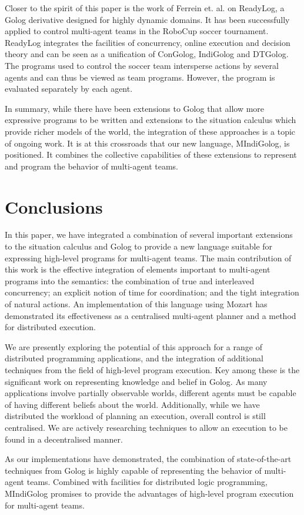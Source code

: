 \documentclass{llncs}
\begin{document}
Closer to the spirit of this paper is the work of Ferrein et. al.
\cite{Ferrein2005readylog} on ReadyLog, a Golog derivative designed
for highly dynamic domains. It has been successfully applied to control
multi-agent teams in the RoboCup soccer tournament. ReadyLog integrates
the facilities of concurrency, online execution and decision theory
and can be seen as a unification of ConGolog, IndiGolog and DTGolog.
The programs used to control the soccer team intersperse actions by
several agents and can thus be viewed as team programs. However, the
program is evaluated separately by each agent.

In summary, while there have been extensions to Golog that allow more
expressive programs to be written and extensions to the situation
calculus which provide richer models of the world, the integration
of these approaches is a topic of ongoing work. It is at this crossroads
that our new language, MIndiGolog, is positioned. It combines the
collective capabilities of these extensions to represent and program
the behavior of multi-agent teams.


\section{Conclusions}

\label{sec:Conclusions-and-Future}

In this paper, we have integrated a combination of several important
extensions to the situation calculus and Golog to provide a new language
suitable for expressing high-level programs for multi-agent teams.
The main contribution of this work is the effective integration of
elements important to multi-agent programs into the semantics: the
combination of true and interleaved concurrency; an explicit notion
of time for coordination; and the tight integration of natural actions.
An implementation of this language using Mozart has demonstrated its
effectiveness as a centralised multi-agent planner and a method for
distributed execution. 

We are presently exploring the potential of this approach for a range
of distributed programming applications, and the integration of additional
techniques from the field of high-level program execution. Key among
these is the significant work on representing knowledge and belief
in Golog. As many applications involve partially observable worlds,
different agents must be capable of having different beliefs about
the world. Additionally, while we have distributed the workload of
planning an execution, overall control is still centralised. We are
actively researching techniques to allow an execution to be found
in a decentralised manner.

As our implementations have demonstrated, the combination of state-of-the-art
techniques from Golog is highly capable of representing the behavior
of multi-agent teams. Combined with facilities for distributed logic
programming, MIndiGolog promises to provide the advantages of high-level
program execution for multi-agent teams.



\end{document}
